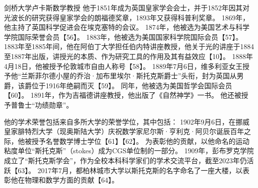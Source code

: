 剑桥大学卢卡斯数学教授
他于1851年成为英国皇家学会会士，并于1852年因其对光波长的研究获得皇家学会的朗福德奖章，1893年又获得科普利奖章。
1869年，他主持了英国科学促进会在埃克塞特的会议。
1874年，他被选为美国艺术与科学学院国际荣誉会员【56】。
1883年，他被选为美国国家科学院国际会员【57】。
1883年至1885年间，他在阿伯丁大学担任伯内特讲座教授，他关于光的讲座于1884至1887年出版，讲授光的本质、作为研究工具的作用及其有益效应【10】。
1888年4月18日，他被授予伦敦城市自由人称号【58】。
1889年7月6日，维多利亚女王授予他“兰斯菲尔德小屋的乔治·加布里埃尔·斯托克斯爵士”头衔，封为英国从男爵，该爵位于1916年绝嗣而灭【59】。
同年，他被选为美国哲学会国际会员【60】。
1891年，作为吉福德讲座教授，他出版了《自然神学》一书。
他还被授予普鲁士“功绩勋章”。

他的学术荣誉包括来自多所大学的荣誉学位，其中包括：
1902年9月6日，在挪威皇家腓特烈大学（现奥斯陆大学）庆祝数学家尼尔斯·亨利克·阿贝尔诞辰百年之际，他被授予名誉数学博士学位【61】【62】。
为表彰他的贡献，以他命名的运动粘度单位“斯托克斯”（stokes）成为CGS单位制的一部分。
1909年，彭布罗克学院成立了“斯托克斯学会”，作为全校本科科学家们的学术交流平台，截至2023年仍活跃【63】。
2017年7月，都柏林城市大学以斯托克斯的名字命名了一座大楼，以表彰他在物理和数学方面的贡献【64】。
